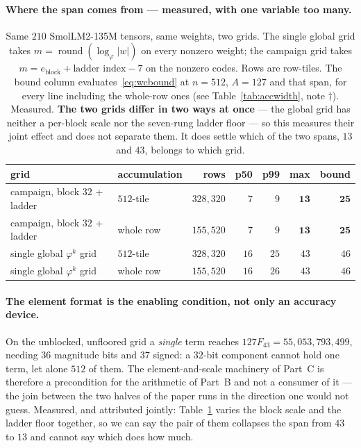 \documentclass[11pt]{article}
\theoremstyle{definition}
\begin{document}
\paragraph{Where the span comes from --- measured, with one variable too many.}
\begin{table}[t]\centering
\caption{Same $210$ SmolLM2-135M tensors, same weights, two grids. The single
global grid takes $m = \operatorname{round}(\log_\varphi |w|)$ on every nonzero
weight; the campaign grid takes $m = e_{\text{block}} + \text{ladder index} - 7$
on the nonzero codes. Rows are row-tiles. The bound column
evaluates~\eqref{eq:wcbound} at $n=512$, $A=127$ and that span, for every line
including the whole-row ones (see Table~\ref{tab:accwidth}, note $\dagger$).
Measured. \textbf{The two grids differ in two ways at once} --- the global grid
has neither a per-block scale nor the seven-rung ladder floor --- so this
measures their joint effect and does not separate them. It does settle which of
the two spans, $13$ and $43$, belongs to which grid.}
\label{tab:spanorigin}
\begin{tabular}{llrrrrr}
\toprule
grid & accumulation & rows & p50 & p99 & max & bound \\
\midrule
campaign, block $32$ + ladder & $512$-tile & $328{,}320$ & $7$  & $9$  & $\mathbf{13}$ & $\mathbf{25}$ \\
campaign, block $32$ + ladder & whole row  & $155{,}520$ & $7$  & $9$  & $\mathbf{13}$ & $\mathbf{25}$ \\
\addlinespace
single global $\varphi^{k}$ grid & $512$-tile & $328{,}320$ & $16$ & $25$ & $43$ & $46$ \\
single global $\varphi^{k}$ grid & whole row  & $155{,}520$ & $16$ & $26$ & $43$ & $46$ \\
\bottomrule
\end{tabular}
\end{table}

\paragraph{The element format is the enabling condition, not only an accuracy
device.} On the unblocked, unfloored grid a \emph{single} term reaches
$127F_{43} = 55{,}053{,}793{,}499$, needing $36$ magnitude bits and $37$ signed:
a $32$-bit component cannot hold one term, let alone $512$ of them. The
element-and-scale machinery of Part~C is therefore a precondition for the
arithmetic of Part~B and not a consumer of it --- the join between the two halves
of the paper runs in the direction one would not guess. Measured, and attributed
jointly: Table~\ref{tab:spanorigin} varies the block scale and the ladder floor
together, so we can say the pair of them collapses the span from $43$ to $13$ and
cannot say which does how much.
\end{document}
